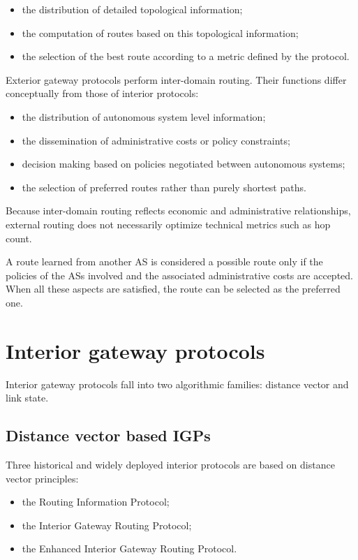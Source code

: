 \documentclass[11pt,a4paper,openany]{report}
\begin{document}
\begin{itemize}
\item the distribution of detailed topological information;
\item the computation of routes based on this topological information;
\item the selection of the best route according to a metric defined by the protocol.
\end{itemize}

Exterior gateway protocols perform inter-domain routing. Their functions differ conceptually from those of interior protocols:

\begin{itemize}
\item the distribution of autonomous system level information;
\item the dissemination of administrative costs or policy constraints;
\item decision making based on policies negotiated between autonomous systems;
\item the selection of preferred routes rather than purely shortest paths.
\end{itemize}

Because inter-domain routing reflects economic and administrative relationships, external routing does not necessarily optimize technical metrics such as hop count.

A route learned from another AS is considered a possible route only if the
policies of the ASs involved and the associated administrative costs are
accepted. When all these aspects are satisfied, the route can be selected as the
preferred one.


\section{Interior gateway protocols}

Interior gateway protocols fall into two algorithmic families: distance vector and link state.

\subsection{Distance vector based IGPs}

Three historical and widely deployed interior protocols are based on distance vector principles:

\begin{itemize}
\item the Routing Information Protocol;
\item the Interior Gateway Routing Protocol;
\item the Enhanced Interior Gateway Routing Protocol.
\end{itemize}
\end{document}
